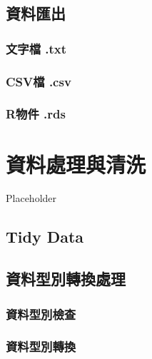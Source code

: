 \documentclass[
]{book}
\begin{document}
\hypertarget{ux8cc7ux6599ux532fux51fa}{%
\section{資料匯出}\label{ux8cc7ux6599ux532fux51fa}}

\hypertarget{ux6587ux5b57ux6a94-.txt}{%
\subsection{文字檔 .txt}\label{ux6587ux5b57ux6a94-.txt}}

\hypertarget{csvux6a94-.csv}{%
\subsection{CSV檔 .csv}\label{csvux6a94-.csv}}

\hypertarget{rux7269ux4ef6-.rds}{%
\subsection{R物件 .rds}\label{rux7269ux4ef6-.rds}}

\hypertarget{manipulation}{%
\chapter{資料處理與清洗}\label{manipulation}}

Placeholder

\hypertarget{tidy-data}{%
\section{Tidy Data}\label{tidy-data}}

\hypertarget{ux8cc7ux6599ux578bux5225ux8f49ux63dbux8655ux7406}{%
\section{資料型別轉換處理}\label{ux8cc7ux6599ux578bux5225ux8f49ux63dbux8655ux7406}}

\hypertarget{ux8cc7ux6599ux578bux5225ux6aa2ux67e5}{%
\subsection{資料型別檢查}\label{ux8cc7ux6599ux578bux5225ux6aa2ux67e5}}

\hypertarget{ux8cc7ux6599ux578bux5225ux8f49ux63db}{%
\subsection{資料型別轉換}\label{ux8cc7ux6599ux578bux5225ux8f49ux63db}}
\end{document}
